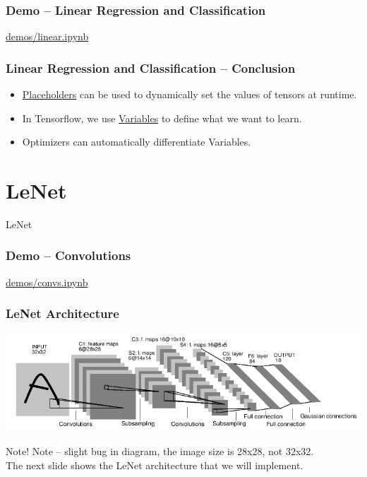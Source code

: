\documentclass{beamer}
\begin{document}
\begin{frame}
  \frametitle{Demo -- Linear Regression and Classification}
  \Huge{\centerline{\href{https://github.com/sig-ai/tf_workshop/blob/master/demos/linear.ipynb}{demos/linear.ipynb}}}
\end{frame}

\begin{frame}
  \frametitle{Linear Regression and Classification -- Conclusion}
  \begin{itemize}
  \item \underline{Placeholders} can be used to dynamically set the values of tensors at runtime.
  \item In Tensorflow, we use \underline{Variables} to define what we want to learn.
  \item Optimizers can automatically differentiate Variables.
  \end{itemize}
\end{frame}


\section{LeNet}
\begin{frame}
  \huge{\centerline{LeNet}}
\end{frame}

\begin{frame}
  \frametitle{Demo -- Convolutions}
  \Huge{\centerline{\href{https://github.com/sig-ai/tf_workshop/blob/master/demos/convs.ipynb}{demos/convs.ipynb}}}
\end{frame}

\begin{frame}
  \frametitle{LeNet Architecture}
  \begin{center}
    \includegraphics[width=1.0\linewidth]{LeNet.png}
  \end{center}
\end{frame}

\begin{frame}
  \begin{block}{Note!}
    Note -- slight bug in diagram, the image size is 28x28, not 32x32. \\
    The next slide shows the LeNet architecture that we will implement.
  \end{block}
\end{frame}
\end{document}
